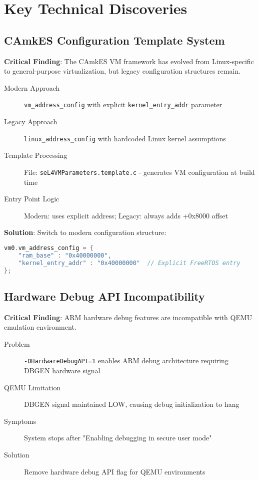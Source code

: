 \documentclass[12pt]{article}
\begin{document}
\section{Key Technical Discoveries}

\subsection{CAmkES Configuration Template System}

\textbf{Critical Finding}: The CAmkES VM framework has evolved from Linux-specific to general-purpose virtualization, but legacy configuration structures remain.

\begin{description}
\item[Modern Approach] \texttt{vm\_address\_config} with explicit \texttt{kernel\_entry\_addr} parameter
\item[Legacy Approach] \texttt{linux\_address\_config} with hardcoded Linux kernel assumptions
\item[Template Processing] File: \texttt{seL4VMParameters.template.c} - generates VM configuration at build time
\item[Entry Point Logic] Modern: uses explicit address; Legacy: always adds +0x8000 offset
\end{description}

\textbf{Solution}: Switch to modern configuration structure:
\begin{lstlisting}[language=C]
vm0.vm_address_config = {
    "ram_base" : "0x40000000",
    "kernel_entry_addr" : "0x40000000"  // Explicit FreeRTOS entry
};
\end{lstlisting}

\subsection{Hardware Debug API Incompatibility}

\textbf{Critical Finding}: ARM hardware debug features are incompatible with QEMU emulation environment.

\begin{description}
\item[Problem] \texttt{-DHardwareDebugAPI=1} enables ARM debug architecture requiring DBGEN hardware signal
\item[QEMU Limitation] DBGEN signal maintained LOW, causing debug initialization to hang
\item[Symptoms] System stops after "Enabling debugging in secure user mode"
\item[Solution] Remove hardware debug API flag for QEMU environments
\end{description}
\end{document}
